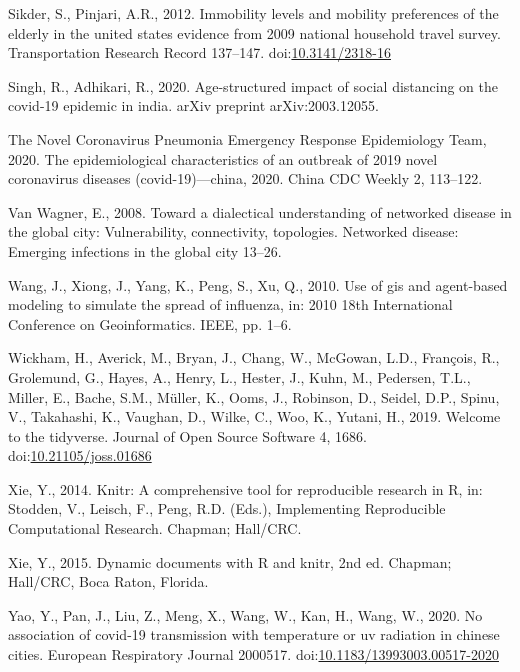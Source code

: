 \documentclass[]{elsarticle} %
\begin{document}
\leavevmode\hypertarget{ref-Sikder2012immobility}{}%
Sikder, S., Pinjari, A.R., 2012. Immobility levels and mobility
preferences of the elderly in the united states evidence from 2009
national household travel survey. Transportation Research Record
137--147. doi:\href{https://doi.org/10.3141/2318-16}{10.3141/2318-16}

\leavevmode\hypertarget{ref-Singh2020age}{}%
Singh, R., Adhikari, R., 2020. Age-structured impact of social
distancing on the covid-19 epidemic in india. arXiv preprint
arXiv:2003.12055.

\leavevmode\hypertarget{ref-Novel2020epidemiological}{}%
The Novel Coronavirus Pneumonia Emergency Response Epidemiology Team,
2020. The epidemiological characteristics of an outbreak of 2019 novel
coronavirus diseases (covid-19)---china, 2020. China CDC Weekly 2,
113--122.

\leavevmode\hypertarget{ref-vanWagner2008toward}{}%
Van Wagner, E., 2008. Toward a dialectical understanding of networked
disease in the global city: Vulnerability, connectivity, topologies.
Networked disease: Emerging infections in the global city 13--26.

\leavevmode\hypertarget{ref-Wang2010gis}{}%
Wang, J., Xiong, J., Yang, K., Peng, S., Xu, Q., 2010. Use of gis and
agent-based modeling to simulate the spread of influenza, in: 2010 18th
International Conference on Geoinformatics. IEEE, pp. 1--6.

\leavevmode\hypertarget{ref-Wickham2019}{}%
Wickham, H., Averick, M., Bryan, J., Chang, W., McGowan, L.D., François,
R., Grolemund, G., Hayes, A., Henry, L., Hester, J., Kuhn, M., Pedersen,
T.L., Miller, E., Bache, S.M., Müller, K., Ooms, J., Robinson, D.,
Seidel, D.P., Spinu, V., Takahashi, K., Vaughan, D., Wilke, C., Woo, K.,
Yutani, H., 2019. Welcome to the tidyverse. Journal of Open Source
Software 4, 1686.
doi:\href{https://doi.org/10.21105/joss.01686}{10.21105/joss.01686}

\leavevmode\hypertarget{ref-Xie2014}{}%
Xie, Y., 2014. Knitr: A comprehensive tool for reproducible research in
R, in: Stodden, V., Leisch, F., Peng, R.D. (Eds.), Implementing
Reproducible Computational Research. Chapman; Hall/CRC.

\leavevmode\hypertarget{ref-Xie2015}{}%
Xie, Y., 2015. Dynamic documents with R and knitr, 2nd ed. Chapman;
Hall/CRC, Boca Raton, Florida.

\leavevmode\hypertarget{ref-Yao2020association}{}%
Yao, Y., Pan, J., Liu, Z., Meng, X., Wang, W., Kan, H., Wang, W., 2020.
No association of covid-19 transmission with temperature or uv radiation
in chinese cities. European Respiratory Journal 2000517.
doi:\href{https://doi.org/10.1183/13993003.00517-2020}{10.1183/13993003.00517-2020}
\end{document}
